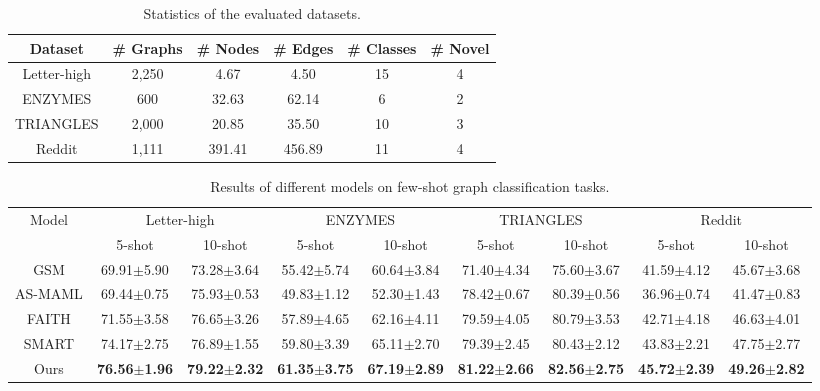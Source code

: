 \begin{table}[ht]
\centering
\renewcommand{\thetable}{S12}
\caption{Statistics of the evaluated datasets.}
\label{dataset_graph}
\begin{tabular}{@{}c|ccccc@{}}
\toprule
Dataset                          & \# Graphs & \# Nodes & \# Edges & \# Classes & \# Novel\\ \midrule
Letter-high & 2,250     & 4.67     & 4.50     & 15         & 4       \\
ENZYMES     & 600       & 32.63    & 62.14    & 6          & 2        \\
TRIANGLES                        & 2,000     & 20.85    & 35.50    & 10         & 3        \\
Reddit  & 1,111     & 391.41   & 456.89   & 11         & 4        \\ \bottomrule
\end{tabular}%
\end{table}

\begin{table*}[ht]
\renewcommand{\thetable}{S13}
\caption{Results of different models on few-shot graph classification tasks.}
\label{res}
\begin{tabular}{@{}c|cccccccc@{}}
\toprule
\multirow{2}{*}{Model} & \multicolumn{2}{c}{Letter-high} & \multicolumn{2}{c}{ENZYMES}     & \multicolumn{2}{c}{TRIANGLES}   & \multicolumn{2}{c}{Reddit}      \\ \cmidrule(l){2-9} 
        & 5-shot & 10-shot & 5-shot & 10-shot & 5-shot & 10-shot & 5-shot & 10-shot \\ \midrule
GSM     & 69.91$\pm$5.90  & 73.28$\pm$3.64   & 55.42$\pm$5.74  & 60.64$\pm$3.84   & 71.40$\pm$4.34  & 75.60$\pm$3.67   & 41.59$\pm$4.12  & 45.67$\pm$3.68   \\
AS-MAML & 69.44$\pm$0.75  & 75.93$\pm$0.53   & 49.83$\pm$1.12  & 52.30$\pm$1.43   & 78.42$\pm$0.67  & 80.39$\pm$0.56   & 36.96$\pm$0.74  & 41.47$\pm$0.83   \\
FAITH   & 71.55$\pm$3.58  & 76.65$\pm$3.26   & 57.89$\pm$4.65  & 62.16$\pm$4.11   & 79.59$\pm$4.05  & 80.79$\pm$3.53   & 42.71$\pm$4.18  & 46.63$\pm$4.01   \\
SMART   & 74.17$\pm$2.75       &  76.89$\pm$1.55       &  59.80$\pm$3.39      &   65.11$\pm$2.70      & 79.39$\pm$2.45       & 80.43$\pm$2.12        &  43.83$\pm$2.21      & 47.75$\pm$2.77        \\
Ours                   & \textbf{76.56$\pm$1.96} & \textbf{79.22$\pm$2.32} & \textbf{61.35$\pm$3.75} & \textbf{67.19$\pm$2.89} & \textbf{81.22$\pm$2.66} & \textbf{82.56$\pm$2.75} & \textbf{45.72$\pm$2.39} & \textbf{49.26$\pm$2.82} \\ \bottomrule
\end{tabular}
\end{table*}

